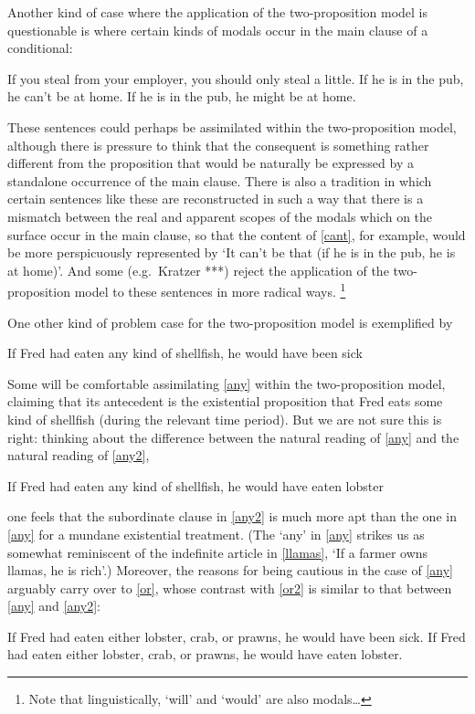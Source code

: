 \documentclass[If.tex]{subfiles}
\begin{document}
Another kind of case where the application of the two-proposition model is questionable is where certain kinds of modals occur in the main clause of a conditional:
\begin{prop}
	\nitem 
	If you steal from your employer, you should only steal a little.
	\nitem \label{cant} 
	If he is in the pub, he can't be at home.
	\nitem 
	If he is in the pub, he might be at home.
\end{prop}
These sentences could perhaps be assimilated within the two-proposition model, although there is pressure to think that the consequent is something rather different from the proposition that would be naturally be expressed by a standalone occurrence of the main clause. There is also a tradition in which certain sentences like these are reconstructed in such a way that there is a mismatch between the real and apparent scopes of the modals which on the surface occur in the main clause, so that the content of \ref{cant}, for example, would be more perspicuously represented by ‘It can't be that (if he is in the pub, he is at home)’. And some (e.g.~Kratzer ***) reject the application of the two-proposition model to these sentences in more radical ways.%
\footnote{Note that linguistically, ‘will’ and ‘would’ are also modals\ldots{}}

One other kind of problem case for the two-proposition model is exemplified by
\begin{prop}
	\nitem \label{any} 
	If Fred had eaten any kind of shellfish, he would have been sick
\end{prop}
Some will be comfortable assimilating \ref{any} within the two-proposition model, claiming that its antecedent is the existential proposition that Fred eats some kind of shellfish (during the relevant time period). But we are not sure this is right: thinking about the difference between the natural reading of \ref{any} and the natural reading of \ref{any2},
\begin{prop}
	\nitem \label{any2} 
	If Fred had eaten any kind of shellfish, he would have eaten lobster
\end{prop}
one feels that the subordinate clause in \ref{any2} is much more apt than the one in \ref{any} for a mundane existential treatment. (The ‘any’ in \ref{any} strikes us as somewhat reminiscent of the indefinite article in \ref{llamas}, ‘If a farmer owns llamas, he is rich’.) Moreover, the reasons for being cautious in the case of \ref{any} arguably carry over to \ref{or}, whose contrast with \ref{or2} is similar to that between \ref{any} and \ref{any2}:
\begin{prop}
	\nitem \label{or} 
	If Fred had eaten either lobster, crab, or prawns, he would have been sick.
	\nitem \label{or2} 
	If Fred had eaten either lobster, crab, or prawns, he would have eaten lobster.
\end{prop}
\end{document}
